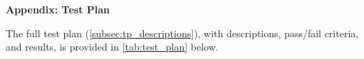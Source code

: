 %

\clearpage
\begin{landscape}
\pagestyle{empty}
\setlength{\textwidth}{\textheight}
\setlength{\linewidth}{\textwidth}

{}
{\large\bfseries\color{ercblue} Appendix: Test Plan}

\bigskip
\noindent The full test plan (\autoref{subsec:tp_descriptions}), with
descriptions, pass/fail criteria, and results, is provided in
\autoref{tab:test_plan} below.



\end{landscape}
\pagestyle{fancy}
\clearpage
